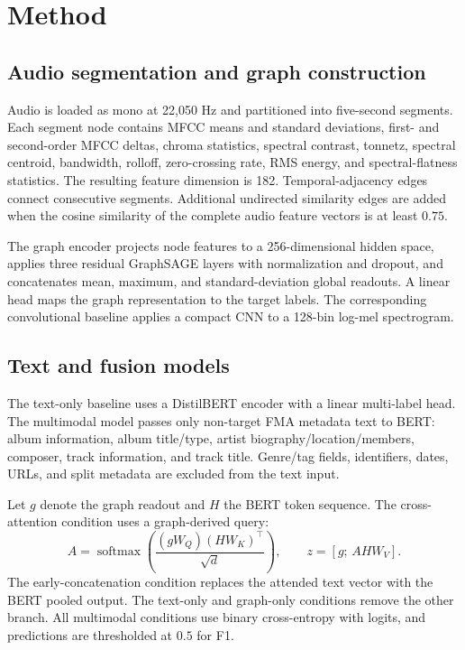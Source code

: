 \documentclass[conference]{IEEEtran}
\begin{document}
\section{Method}
\subsection{Audio segmentation and graph construction}
Audio is loaded as mono at 22{,}050 Hz and partitioned into five-second
segments. Each segment node contains MFCC means and standard deviations,
first- and second-order MFCC deltas, chroma statistics, spectral contrast,
tonnetz, spectral centroid, bandwidth, rolloff, zero-crossing rate, RMS
energy, and spectral-flatness statistics. The resulting feature dimension is
182. Temporal-adjacency edges connect consecutive segments. Additional
undirected similarity edges are added when the cosine similarity of the
complete audio feature vectors is at least $0.75$.

The graph encoder projects node features to a 256-dimensional hidden
space, applies three residual GraphSAGE layers with normalization and
dropout, and concatenates mean, maximum, and standard-deviation global
readouts. A linear head maps the graph representation to the target labels.
The corresponding convolutional baseline applies a compact CNN to a
128-bin log-mel spectrogram.

\subsection{Text and fusion models}
The text-only baseline uses a DistilBERT encoder with a linear multi-label
head. The multimodal model passes only non-target FMA metadata text to BERT:
album information, album
title/type, artist biography/location/members, composer, track information,
and track title. Genre/tag fields, identifiers, dates, URLs, and split
metadata are excluded from the text input.

Let $g$ denote the graph readout and $H$ the BERT token sequence. The
cross-attention condition uses a graph-derived query:
\begin{equation}
 A = \operatorname{softmax}\left(\frac{(gW_Q)(HW_K)^\top}{\sqrt{d}}\right),
 \qquad
 z = [g;\, AHW_V].
\end{equation}
The early-concatenation condition replaces the attended text vector with the
BERT pooled output. The text-only and graph-only conditions remove the other
branch. All multimodal conditions use binary cross-entropy with logits, and
predictions are thresholded at $0.5$ for F1.
\end{document}
